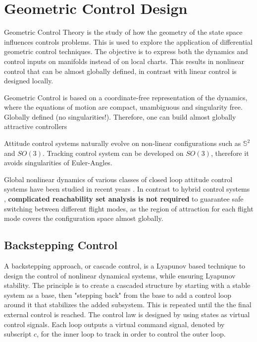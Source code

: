 \chapter{Geometric Control Design} \label{ch:control}

\cite{Bullo2005,Jurdjevic1997}

Geometric Control Theory is the study of how the geometry of the state space influences controls problems. This is used to explore the application of differential geometric control techniques. 
The objective is to express both the dynamics and control inputs on manifolds instead of on local charts.
This results in nonlinear control that can be almost globally defined, in contrast with linear control is designed locally.


Geometric Control is based on a coordinate-free representation of the dynamics, where the equations of motion are compact, unambiguous and singularity free. 
Globally defined (no singularities!). Therefore, one can build almost globally attractive controllers

Attitude control systems naturally evolve on non-linear configurations such as $ \mathbb{S}^2 $ and $ SO(3) $. 
Tracking control system can be developed on $ SO(3) $, therefore it avoids singularities of Euler-Angles.

Global nonlinear dynamics of various classes of closed loop attitude control systems have been studied in recent years \cite{Chaturvedi2011a}.
In contrast to hybrid control systems \cite{Gillula2010}, \textbf{complicated reachability set analysis is not required} to guarantee safe switching between different flight modes, as the region of attraction for each flight mode covers the configuration space almost globally.

\section{Backstepping Control}
A backstepping approach, or cascade control, is a Lyapunov based technique to design the control of nonlinear dynamical systems, while ensuring Lyapunov stability. The principle is to create a cascaded structure by starting with a stable system as a base, then "stepping back" from the base to add a control loop around it that stabilizes the added subsystem. This is repeated until the the final external control is reached.
The control law is designed by using states as virtual control signals. Each loop outputs a virtual command signal, denoted by subscript $ c $, for the inner loop to track in order to control the outer loop.

